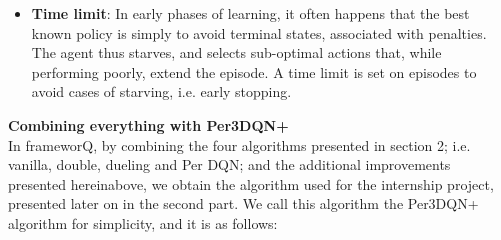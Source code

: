 \begin{itemize}
  \item \textbf{Time limit}: In early phases of learning, it often happens that the best known policy is simply to avoid terminal states, associated with penalties. The agent thus starves, and selects sub-optimal actions that, while performing poorly, extend the episode. A time limit is set on episodes to avoid cases of starving, i.e. early stopping.
\end{itemize}

\pagebreak

\textbf{Combining everything with Per3DQN+} \\
In frameworQ, by combining the four algorithms presented in section 2; i.e. vanilla, double, dueling and Per DQN; and the additional improvements presented hereinabove, we obtain the algorithm used for the internship project, presented later on in the second part. We call this algorithm the Per3DQN+ algorithm for simplicity, and it is as follows:

